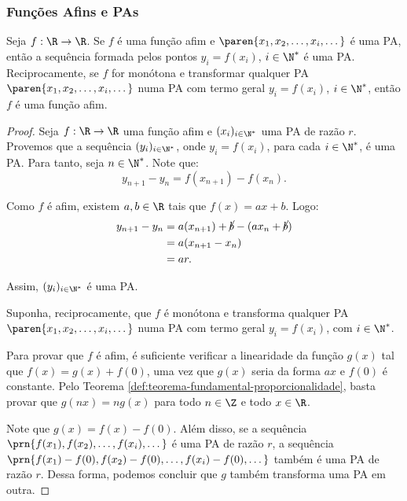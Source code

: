 \subsubsection{Funções Afins e PAs}

\begin{proposition}
Seja  $f: \R \to \R$. Se $f$ é uma função afim e $\paren{x_1, x_2,
\dots , x_i, \dots}$ é uma PA, então a sequência formada pelos
pontos $y_i = f(x_i)$, $i \in \N^*$ é uma PA. Reciprocamente,
se $f$ for monótona e transformar qualquer PA $\paren{x_1, x_2,
\dots , x_i, \dots}$ numa PA com termo geral $y_i = f(x_i)$, $i \in
\N^*$, então $f$ é uma função afim.    
\end{proposition}

\begin{proof}
    Seja $f: \R \to \R$ uma função afim e $(x_i)_{i\in\N^*}$ uma PA de razão $r$. 
    Provemos que a sequência $(y_i)_{i\in\N^*}$, onde $y_i = f(x_i)$, para cada $i \in \N^*$, 
    é uma PA.
    Para tanto, seja $n \in \N^*$. 
    Note que:
    \[
        y_{n+1}-y_n = f(x_{n+1})-f(x_n).
    \]

    Como $f$ é afim, existem $a,b\in\R$ tais que $f(x)=ax+b$.
    Logo:
    \begin{align*}
        y_{n+1}-y_n &= a(x_{n+1})+\cancel b - (ax_n+\cancel b) \\ &= a(x_{n+1}-x_n) \\ &= ar.
    \end{align*}
    
    Assim, $(y_i)_{i\in\N^*}$ é uma PA.

    Suponha, reciprocamente, que $f$ é monótona e transforma qualquer
    PA $\paren{x_1, x_2, \dots , x_i, \dots}$ numa PA com termo geral $y_i = f(x_i)$, com $i \in
    \N^*$. 

    Para provar que $f$ é afim, é suficiente verificar a linearidade da função $g(x)$ tal que
    $f(x) = g(x) + f(0)$, uma vez que $g(x)$ seria da forma $ax$ e $f(0)$ é constante. 
    Pelo Teorema \ref{def:teorema-fundamental-proporcionalidade}, basta provar que 
    $g(nx) = ng(x)$ para todo $n \in \Z$ e todo $x \in \R$.

    Note que $g(x) = f(x) - f(0)$. Além disso, se a sequência $\prn{f(x_1), f(x_2), \dots, f(x_i), \dots}$
    é uma PA de razão $r$, a sequência $\prn{f(x_1) - f(0), f(x_2) - f(0), \dots, f(x_i) - f(0), \dots}$ também é 
    uma PA de razão $r$. Dessa forma, podemos concluir que $g$ também transforma uma PA em outra.


\end{proof}
